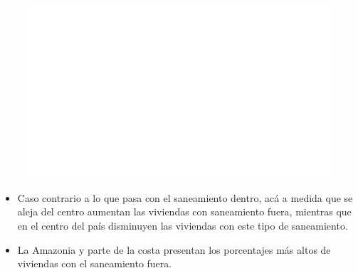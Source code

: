     \begin{figure}[H]
        \caption[Saneamiento fuera de la vivienda por departamentos (mapa) - 2010 VS 2020 ]{\label{saneamiento_fuera_mapa} }
        \begin{center}
        \includegraphics[width=\textwidth,keepaspectratio]{img/var_195_map.png}
        \end{center}
    \end{figure}
            \begin{itemize}
                    \item Caso contrario a lo que pasa con el saneamiento dentro, acá a medida que se aleja del centro aumentan las viviendas con saneamiento fuera, mientras que en el centro del país disminuyen las viviendas con este tipo de saneamiento.
                    \item La Amazonia y parte de la costa presentan los porcentajes más altos de viviendas con el saneamiento fuera.
                    \end{itemize}

